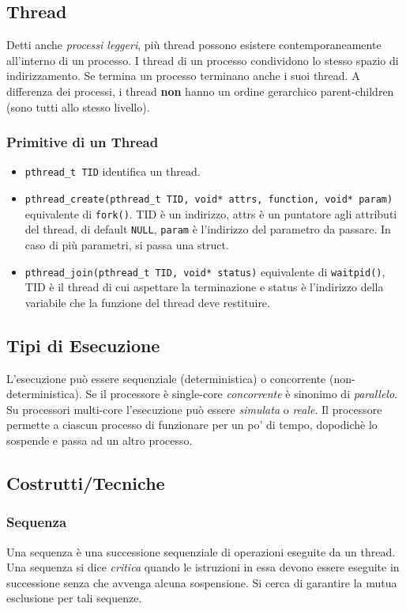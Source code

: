 \documentclass[10pt,a4paper]{article}
\newcommand{\code}{\texttt}
\begin{document}
\subsection{Thread} Detti anche \emph{processi leggeri}, più thread possono esistere contemporaneamente all'interno di un processo. I thread di un processo condividono lo stesso spazio di indirizzamento. Se termina un processo terminano anche i suoi thread. A differenza dei processi, i thread \textbf{non} hanno un ordine gerarchico parent-children (sono tutti allo stesso livello).

\subsubsection{Primitive di un Thread}
\begin{itemize}
    \item \code{pthread\_t TID} identifica un thread.
    \item \code{pthread\_create(pthread\_t TID, void* attrs, function, void* param)} equivalente di \code{fork()}. TID è un indirizzo, attrs è un puntatore agli attributi del thread, di default \code{NULL}, \code{param} è l'indirizzo del parametro da passare. In caso di più parametri, si passa una struct.
    \item \code{pthread\_join(pthread\_t TID, void* status)} equivalente di \code{waitpid()}, TID è il thread di cui aspettare la terminazione e status è l'indirizzo della variabile che la funzione del thread deve restituire.
\end{itemize}

\subsection{Tipi di Esecuzione}
L'esecuzione può essere sequenziale (deterministica) o concorrente (non-deterministica). Se il processore è single-core \emph{concorrente} è sinonimo di \emph{parallelo}. Su processori multi-core l'esecuzione può essere \emph{simulata} o \emph{reale}. Il processore permette a ciascun processo di funzionare per un po' di tempo, dopodichè lo sospende e passa ad un altro processo.

\subsection{Costrutti/Tecniche}

\subsubsection{Sequenza}
Una sequenza è una successione sequenziale di operazioni eseguite da un thread. Una sequenza si dice \emph{critica} quando le istruzioni in essa devono essere eseguite in successione senza che avvenga alcuna sospensione. Si cerca di garantire la mutua esclusione per tali sequenze.
\end{document}
